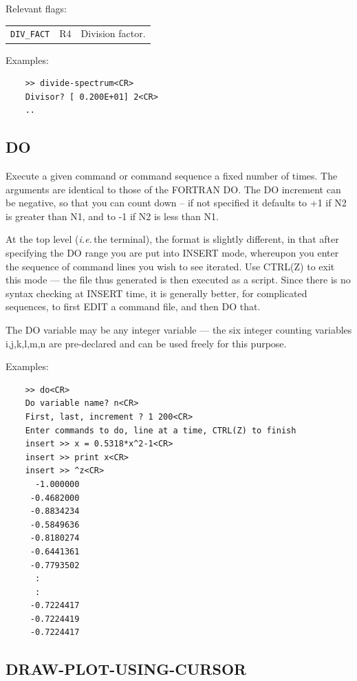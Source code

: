 \documentclass[11pt,twoside]{report}
\newcommand{\ie}{{\it i.e.\,}}
\begin{document}
Relevant flags:\\
\begin{tabular}{lll}
  \verb+DIV_FACT+ & R4 & Division factor.
\end{tabular}

Examples:
\begin{verbatim}
    >> divide-spectrum<CR>
    Divisor? [ 0.200E+01] 2<CR>
    ..
\end{verbatim}

\subsection{DO}  

Execute a given command or command sequence a fixed number of times.
The arguments are identical to those of the FORTRAN DO. The DO increment
can be negative, so that you can count down -- if not specified it defaults
to +1 if N2 is greater than N1, and to -1 if N2 is less than N1.

At the top level (\ie the terminal), the format is slightly different, in
that after specifying the DO range you are put into INSERT mode, whereupon
you enter the sequence of command lines you wish to see iterated. Use 
CTRL(Z) to exit this mode --- the file thus generated is then executed as
a script.
Since there is no syntax checking at INSERT time,
it is generally better, for complicated sequences, to first EDIT a command
file, and then DO that.

The DO variable may be any integer variable --- the six integer counting
variables i,j,k,l,m,n are pre-declared and can be used freely for this purpose.

Examples:
\begin{verbatim}
    >> do<CR>
    Do variable name? n<CR>
    First, last, increment ? 1 200<CR>
    Enter commands to do, line at a time, CTRL(Z) to finish
    insert >> x = 0.5318*x^2-1<CR>
    insert >> print x<CR>
    insert >> ^z<CR>
      -1.000000
     -0.4682000
     -0.8834234
     -0.5849636
     -0.8180274
     -0.6441361
     -0.7793502
      :
      :
     -0.7224417
     -0.7224419
     -0.7224417
\end{verbatim}

\subsection{DRAW-PLOT-USING-CURSOR} 
\end{document}
